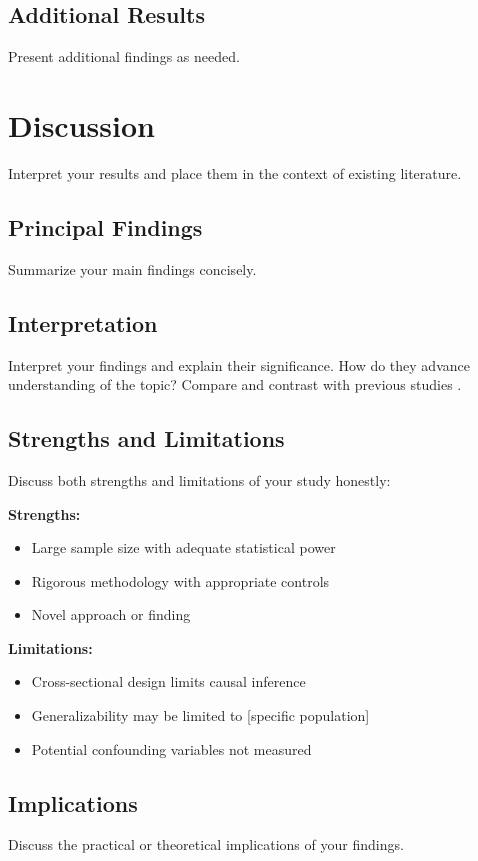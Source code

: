 \documentclass[10pt,letterpaper]{article}
\begin{document}
\subsection*{Additional Results}
Present additional findings as needed.

\section*{Discussion}

Interpret your results and place them in the context of existing literature.

\subsection*{Principal Findings}
Summarize your main findings concisely.

\subsection*{Interpretation}
Interpret your findings and explain their significance. How do they advance understanding of the topic? Compare and contrast with previous studies \cite{brown2021,williams2020}.

\subsection*{Strengths and Limitations}
Discuss both strengths and limitations of your study honestly:

\textbf{Strengths:}
\begin{itemize}
    \item Large sample size with adequate statistical power
    \item Rigorous methodology with appropriate controls
    \item Novel approach or finding
\end{itemize}

\textbf{Limitations:}
\begin{itemize}
    \item Cross-sectional design limits causal inference
    \item Generalizability may be limited to [specific population]
    \item Potential confounding variables not measured
\end{itemize}

\subsection*{Implications}
Discuss the practical or theoretical implications of your findings.
\end{document}
